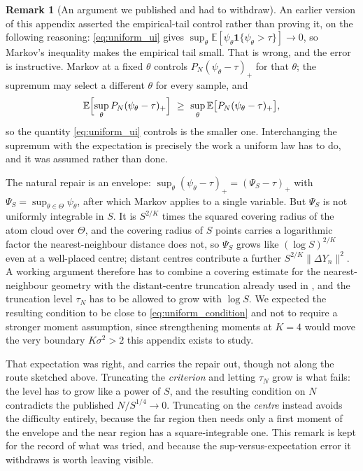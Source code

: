 \documentclass[11pt]{article}
\theoremstyle{definition}
\newtheorem{remark}[remark]{Remark}
\newcommand{\E}{\mathbb{E}}
\begin{document}
\begin{remark}[An argument we published and had to withdraw]\label{rem:ullnn_gap}
An earlier version of this appendix asserted the empirical-tail control rather than proving it, on the following reasoning: \eqref{eq:uniform_ui} gives $\sup_\theta\E[\psi_\theta\mathbf{1}\{\psi_\theta>\tau\}]\to0$, so Markov's inequality makes the empirical tail small. That is wrong, and the error is instructive. Markov at a fixed $\theta$ controls $P_N(\psi_\theta-\tau)_+$ for that $\theta$; the supremum may select a different $\theta$ for every sample, and
\[
\E\Bigl[\sup_\theta P_N(\psi_\theta-\tau)_+\Bigr]\ \ge\ \sup_\theta\E\bigl[P_N(\psi_\theta-\tau)_+\bigr],
\]
so the quantity \eqref{eq:uniform_ui} controls is the smaller one. Interchanging the supremum with the expectation is precisely the work a uniform law has to do, and it was assumed rather than done.

The natural repair is an envelope: $\sup_\theta(\psi_\theta-\tau)_+=(\Psi_S-\tau)_+$ with $\Psi_S=\sup_{\theta\in\Theta}\psi_\theta$, after which Markov applies to a single variable. But $\Psi_S$ is not uniformly integrable in $S$. It is $S^{2/K}$ times the squared covering radius of the atom cloud over $\Theta$, and the covering radius of $S$ points carries a logarithmic factor the nearest-neighbour distance does not, so $\Psi_S$ grows like $(\log S)^{2/K}$ even at a well-placed centre; distant centres contribute a further $S^{2/K}\lVert\Delta Y_n\rVert^2$. A working argument therefore has to combine a covering estimate for the nearest-neighbour geometry with the distant-centre truncation already used in , and the truncation level $\tau_N$ has to be allowed to grow with $\log S$. We expected the resulting condition to be close to \eqref{eq:uniform_condition} and not to require a stronger moment assumption, since strengthening moments at $K=4$ would move the very boundary $K\sigma^2>2$ this appendix exists to study.

That expectation was right, and  carries the repair out, though not along the route sketched above. Truncating the \emph{criterion} and letting $\tau_N$ grow is what fails: the level has to grow like a power of $S$, and the resulting condition on $N$ contradicts the published $N/S^{1/4}\to0$. Truncating on the \emph{centre} instead avoids the difficulty entirely, because the far region then needs only a first moment of the envelope and the near region has a square-integrable one. This remark is kept for the record of what was tried, and because the sup-versus-expectation error it withdraws is worth leaving visible.
\end{remark}
\end{document}
